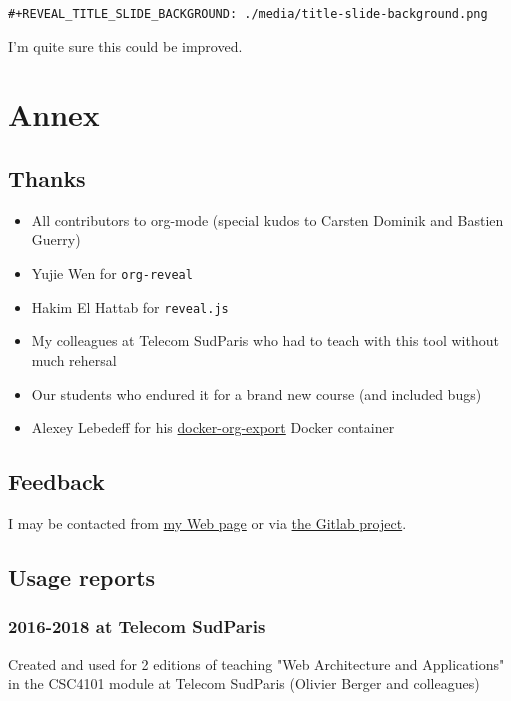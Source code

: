 \documentclass[a4paper]{article}
\begin{document}
\begin{verbatim}
#+REVEAL_TITLE_SLIDE_BACKGROUND: ./media/title-slide-background.png
\end{verbatim}

I'm quite sure this could be improved.


\section{Annex}
\label{sec:org5e37a46}

\subsection{Thanks}
\label{sec:orgbfeee1a}

\begin{itemize}
\item All contributors to org-mode (special kudos to Carsten Dominik and Bastien Guerry)
\item Yujie Wen for \texttt{org-reveal}
\item Hakim El Hattab for \texttt{reveal.js}
\item My colleagues at Telecom SudParis who had to teach with this tool without much rehersal
\item Our students who endured it for a brand new course (and included bugs)
\item Alexey Lebedeff for his
\href{https://github.com/binarin/docker-org-export}{docker-org-export}
Docker container
\end{itemize}

\subsection{Feedback}
\label{sec:org62f35ef}

I may be contacted from \href{http://www-public.tem-tsp.eu/\~berger\_o/\#sec-3}{my Web page} or via \href{https://gitlab.com/olberger/org-teaching}{the Gitlab project}.

\subsection{Usage reports}
\label{sec:org1bb2881}

\subsubsection{2016-2018 at Telecom SudParis}
\label{sec:org89973f4}

Created and used for 2 editions of teaching "Web Architecture and Applications" in the CSC4101 module at Telecom SudParis (Olivier Berger and colleagues)
\end{document}

